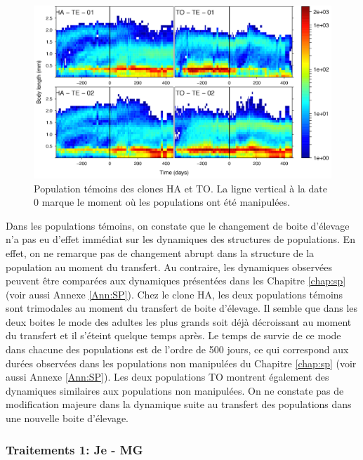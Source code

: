 \begin{figure}[!ht]
\begin{center}
\includegraphics[width=1\textwidth]{1_CorpsDeThese/Resumes/Fig/SM04}
\caption[Population
témoins des clones HA et TO]{Population
témoins des clones HA et TO. La ligne vertical à la date 0 marque le moment où
les populations ont été manipulées.}
\label{fig:SM3}
\end{center}
\end{figure}

Dans les populations témoins, on constate que le changement de boite d'élevage
n'a pas eu d'effet immédiat sur les dynamiques des structures de populations. En
effet, on ne remarque pas de changement abrupt dans la structure de la
population au moment du transfert. Au contraire, les dynamiques observées
peuvent être comparées aux dynamiques présentées dans les Chapitre \ref{chap:sp}
(voir aussi Annexe \ref{Ann:SP}). Chez le clone HA, les deux populations témoins
sont trimodales au moment du transfert de boite d'élevage. Il semble que dans
les deux boites le mode des adultes les plus grands soit déjà décroissant au
moment du transfert et il s'éteint quelque temps après. Le temps de survie de ce
mode dans chacune des populations est de l'ordre de 500 jours, ce qui correspond
aux durées observées dans les populations non manipulées du Chapitre
\ref{chap:sp} (voir aussi Annexe \ref{Ann:SP}). Les deux populations TO montrent
également des dynamiques similaires aux populations non manipulées. On ne
constate pas de modification majeure dans la dynamique suite au transfert des
populations dans une nouvelle boite d'élevage.

\subsubsection{Traitements 1: Je - MG}

